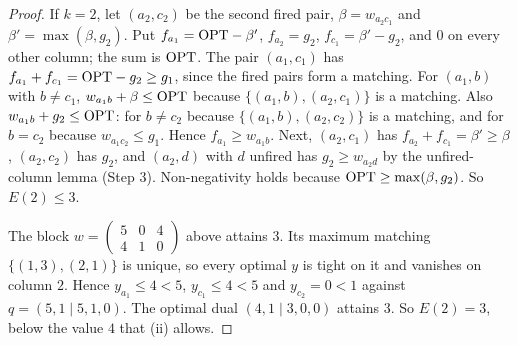 \begin{proof}
If $k = 2$, let $(a_2,c_2)$ be the second fired pair, $\beta = w_{a_2c_1}$ and
$\beta' = \max(\beta, g_2)$. Put $f_{a_1} = \mathrm{OPT}-\beta'$, $f_{a_2} = g_2$,
$f_{c_1} = \beta'-g_2$, and $0$ on every other column; the sum is $\mathrm{OPT}$. The pair $(a_1,c_1)$
has $f_{a_1}+f_{c_1} = \mathrm{OPT}-g_2 \ge g_1$, since the fired pairs form a matching. For $(a_1,b)$
with $b \ne c_1$, $w_{a_1b}+\beta \le \mathrm{OPT}$ because $\{(a_1,b),(a_2,c_1)\}$ is a matching.
Also $w_{a_1b}+g_2 \le \mathrm{OPT}$: for $b \ne c_2$ because $\{(a_1,b),(a_2,c_2)\}$ is a matching, and
for $b = c_2$ because $w_{a_1c_2} \le g_1$. Hence $f_{a_1} \ge w_{a_1b}$. Next,
$(a_2,c_1)$ has $f_{a_2}+f_{c_1} = \beta' \ge \beta$, $(a_2,c_2)$ has $g_2$, and
$(a_2,d)$ with $d$ unfired has $g_2 \ge w_{a_2d}$ by the unfired-column lemma (Step 3).
Non-negativity holds because $\mathrm{OPT} \ge \max(\beta, g_2)$. So $E(2) \le 3$.

The block $w = \left(\begin{smallmatrix} 5&0&4\\ 4&1&0 \end{smallmatrix}\right)$ above attains
$3$. Its maximum matching $\{(1,3),(2,1)\}$ is unique, so every optimal $y$ is tight on it and
vanishes on column $2$. Hence $y_{a_1} \le 4 < 5$, $y_{c_1} \le 4 < 5$ and
$y_{c_2} = 0 < 1$ against $q = (5,1 \mid 5,1,0)$. The optimal dual $(4,1 \mid 3,0,0)$ attains
$3$. So $E(2) = 3$, below the value $4$ that (ii) allows.


\end{proof}
